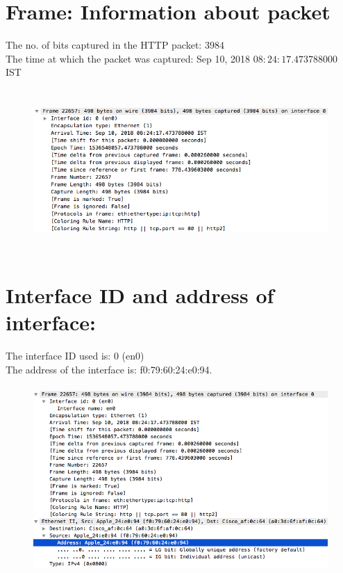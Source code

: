 \documentclass[]{report}
\begin{document}
\section{Frame: Information about packet}
The no. of bits captured in the HTTP packet: $3984$ 
\\
The time at which the packet was captured: Sep 10, 2018 $08:24:17.473788000$ IST
\begin{figure}[H]
	\vspace{0pt}
	\includegraphics[height = 175pt, keepaspectratio]{Snapshots/q6.png}
\end{figure}

\section{Interface ID and address of interface:}
The interface ID used is: $0$ (en0)
\\
The address of the interface is: f0:79:60:24:e0:94.
\begin{figure}[H]
	\vspace{0pt}
	\includegraphics[height = 200pt, keepaspectratio]{Snapshots/q7.png}
\end{figure}
\end{document}
